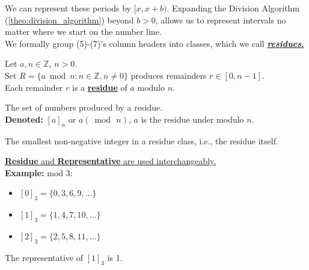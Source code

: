 \noindent
We can represent these periods by $[x, x+b)$. Expanding the Division Algorithm (\ref{theo:division_algorithm}) beyond $b>0$, allows us to
represent intervals no matter where we start on the number line.\\

\noindent
We formally group (5)-(7)'s column headers into classes, which we call \underline{\textbf{\textit{residues}.}}

\newpage

\begin{Def}[Residue]

    \label{def:residue}

    Let $a,n\in\mathbb{Z}$, $n>0$.\\

    \noindent
    Set $R=\{a\bmod n: n\in\mathbb{Z}, n\neq0\}$ produces remainders $r\in[0,n-1]$.\\
    Each remainder $r$ is a \underline{\textbf{residue}} of $a$ modulo $n$.
\end{Def}

\begin{Def}

    \label{def:residue_class}

    The set of numbers produced by a residue.\\

    \noindent
    \textbf{Denoted:} $[a]_n$ or $a (\bmod\, n)$, $a$ is the residue under modulo $n$.
\end{Def}

\begin{Def}[Representative]

    \label{def:representative}

    The smallest non-negative integer in a residue class, i.e., the residue itself.
\end{Def}
\underline{\textbf{Residue} and \textbf{Representative} are used interchangeably.}\\

\noindent
\textbf{Example:} mod 3:
\begin{itemize}
    \item $[0]_3=\{0,3,6,9,\dots\}$
    \item $[1]_3=\{1,4,7,10,\dots\}$
    \item $[2]_3=\{2,5,8,11,\dots\}$
\end{itemize}

\noindent
The representative of $[1]_3$ is 1.\\


